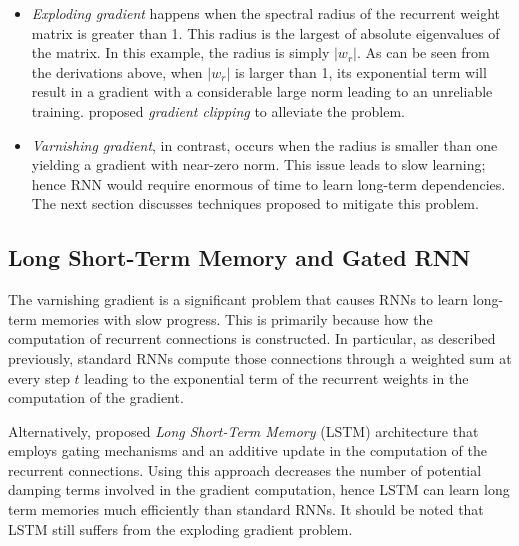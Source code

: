 %
%
%
\begin{itemize}
	\item \textit{Exploding gradient} happens when the spectral radius of the recurrent weight matrix is greater than 1. This radius is the largest of absolute eigenvalues of the matrix. In this example, the radius is simply $|w_r|$. As can be seen from the derivations above, when $|w_r|$ is larger than 1, its exponential term will result in a gradient with a considerable large norm leading to an unreliable training. \citet{Pascanudifficultytrainingrecurrent2013} proposed \textit{gradient clipping} to alleviate the problem.
	\item \textit{Varnishing gradient}, in contrast, occurs when the radius is smaller than one yielding a gradient with near-zero norm. This issue leads to slow learning; hence RNN would require enormous of time to learn long-term dependencies. The next section discusses techniques proposed to mitigate this problem.
\end{itemize}



\subsection{Long Short-Term Memory and Gated RNN}
The varnishing gradient is a significant problem that causes RNNs to learn long-term memories with slow progress. This is primarily because how the computation of recurrent connections is constructed. In particular, as described previously, standard RNNs compute those connections through a weighted sum at every step $t$ leading to the exponential term of the recurrent weights in the computation of the gradient.

Alternatively, \citet{HochreiterLongshorttermmemory1997} proposed \textit{Long Short-Term Memory} (LSTM) architecture that employs gating mechanisms and an additive update in the computation of the recurrent connections. Using this approach  decreases the number of potential damping terms involved in the gradient computation, hence LSTM can learn long term memories much efficiently than standard RNNs. It should be noted that LSTM still suffers from the exploding gradient problem.

